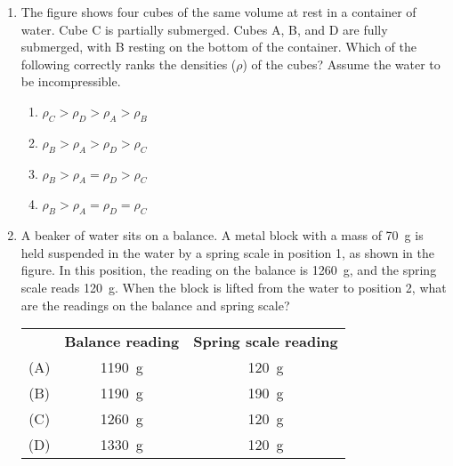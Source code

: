 \documentclass{../../oss-apphys}
\begin{document}
\begin{multicols}{2}
\begin{enumerate}[leftmargin=18pt,start=3]
    \columnbreak
    
  \item The figure shows four cubes of the same volume at rest in a container
    of water. Cube C is partially submerged. Cubes A, B, and D are fully
    submerged, with B resting on the bottom of the container. Which of the
    following correctly ranks the densities ($\rho$) of the cubes? Assume the
    water to be incompressible.
    \begin{center}
      \vspace{-.15in}
    \end{center}
    \begin{enumerate}[noitemsep,topsep=0pt,leftmargin=18pt,label=(\Alph*)]
    \item $\rho_C >\rho_D >\rho_A >\rho_B$
    \item $\rho_B >\rho_A >\rho_D >\rho_C$
    \item $\rho_B >\rho_A =\rho_D >\rho_C$
    \item $\rho_B >\rho_A =\rho_D =\rho_C$
    \end{enumerate}

  \item A beaker of water sits on a balance. A metal block with a mass of
    \SI{70}{\gram} is held suspended in the water by a spring scale in position
    1, as shown in the figure. In this position, the reading on the balance is
    \SI{1260}{\gram}, and the spring scale reads \SI{120}{g}. When the block is
    lifted from the water to position 2, what are the readings on the balance
    and spring scale?
    \begin{center}
      \vspace{-.15in}

      \begin{tabular}{c c c}
        & \textbf{Balance reading} & \textbf{Spring scale reading}\\
        (A) & \SI{1190}{\gram} & \SI{120}{\gram}\\
        (B) & \SI{1190}{\gram} & \SI{190}{\gram}\\
        (C) & \SI{1260}{\gram} & \SI{120}{\gram}\\
        (D) & \SI{1330}{\gram} & \SI{120}{\gram}
      \end{tabular}
    \end{center}

    \columnbreak
    

\end{enumerate}
\end{multicols}
\end{document}
